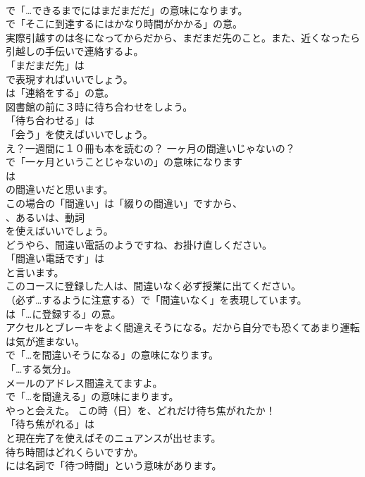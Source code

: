 \documentclass[8pt]{extreport}
\begin{document}
\begin{CJK}{UTF8}{min}
\\	で「…できるまでにはまだまだだ」の意味になります。
\\	で「そこに到達するにはかなり時間がかかる」の意。	
\\	実際引越すのは冬になってからだから、まだまだ先のこと。また、近くなったら引越しの手伝いで連絡するよ。 
\\	「まだまだ先」は 
\\	で表現すればいいでしょう。
\\	は「連絡をする」の意。	
\\	図書館の前に３時に待ち合わせをしよう。 
\\	「待ち合わせる」は
\\	「会う」を使えばいいでしょう。	
\\	え？一週間に１０冊も本を読むの？ 一ヶ月の間違いじゃないの？ 
\\	で「一ヶ月ということじゃないの」の意味になります	
\\	は 
\\	の間違いだと思います。 
\\	この場合の「間違い」は「綴りの間違い」ですから、
\\	、あるいは、動詞
\\	を使えばいいでしょう。	
\\	どうやら、間違い電話のようですね、お掛け直しください。 
\\	「間違い電話です」は 
\\	と言います。	
\\	このコースに登録した人は、間違いなく必ず授業に出てください。 
\\	（必ず…するように注意する）で「間違いなく」を表現しています。
\\	は「…に登録する」の意。	
\\	アクセルとブレーキをよく間違えそうになる。だから自分でも恐くてあまり運転は気が進まない。 
\\	で「…を間違いそうになる」の意味になります。
\\	「…する気分」。	
\\	メールのアドレス間違えてますよ。 
\\	で「…を間違える」の意味にまります。	
\\	やっと会えた。 この時（日）を、どれだけ待ち焦がれたか！ 
\\	「待ち焦がれる」は
\\	と現在完了を使えばそのニュアンスが出せます。	
\\	待ち時間はどれくらいですか。 
\\	には名詞で「待つ時間」という意味があります。	

\end{CJK}
\end{document}
